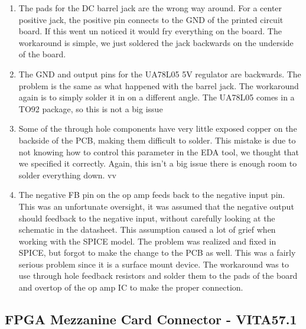 \documentclass[a4paper, 12pt, notitlepage]{article}
\begin{document}
\begin{enumerate}
  \item{
    The pads for the DC barrel jack are the wrong way around.  For a center positive jack, the positive pin connects to the GND of the printed circuit board.  If this went un noticed it would fry everything on the board.  The workaround is simple, we just soldered the jack backwards on the underside of the board.
  }

  \item{
    The GND and output pins for the UA78L05 5V regulator are backwards.  The problem is the same as what happened with the barrel jack.  The workaround again is to simply solder it in on a different angle.  The UA78L05 comes in a TO92 package, so this is not a big issue
  }

  \item{
    Some of the through hole components have very little exposed copper on the backside of the PCB, making them difficult to solder.  This mistake is due to not knowing how to control this parameter in the EDA tool, we thought that we specified it correctly.  Again, this isn't a big issue there is enough room to solder everything down.
    }
vv
  \item{ %
    The negative FB pin on the op amp feeds back to the negative input pin.  This was an unfortunate oversight, it was assumed that the negative output should feedback to the negative input, without carefully looking at the schematic in the datasheet.  This assumption caused a lot of grief when working with the SPICE model.  The problem was realized and fixed in SPICE, but forgot to make the change to the PCB as well.  This was a fairly serious problem since it is a surface mount device.  The workaround was to use through hole feedback resistors and solder them to the pads of the board and overtop of the op amp IC to make the proper connection.
  }

\end{enumerate}

\subsection{FPGA Mezzanine Card Connector - VITA57.1}

\clearpage


\end{document}
